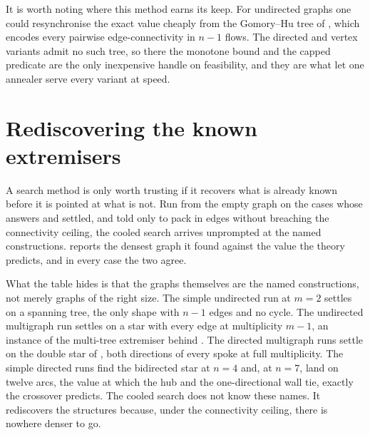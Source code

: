 It is worth noting where this method earns its keep. For undirected graphs one could resynchronise the exact value cheaply from the Gomory--Hu tree of , which encodes every pairwise edge-connectivity in $n - 1$ flows. The directed and vertex variants admit no such tree, so there the monotone bound and the capped predicate are the only inexpensive handle on feasibility, and they are what let one annealer serve every variant at speed.

\section{Rediscovering the known extremisers}

A search method is only worth trusting if it recovers what is already known before it is pointed at what is not. Run from the empty graph on the cases whose answers  and  settled, and told only to pack in edges without breaching the connectivity ceiling, the cooled search arrives unprompted at the named constructions.  reports the densest graph it found against the value the theory predicts, and in every case the two agree.

\begin{table}[t]
    \centering
    
    \caption{Validation by rediscovery. For each variant the temperature search, run from scratch with a handful of restarts, recovers exactly the extremal value proved or certified in the earlier chapters. The ``Search'' column is an honest lower bound found by annealing, and the ``Theory'' column is the proved or certified value.}
    \label{tab:rediscovery}
\end{table}

What the table hides is that the graphs themselves are the named constructions, not merely graphs of the right size. The simple undirected run at $m = 2$ settles on a spanning tree, the only shape with $n - 1$ edges and no cycle. The undirected multigraph run settles on a star with every edge at multiplicity $m - 1$, an instance of the multi-tree extremiser behind . The directed multigraph runs settle on the double star of , both directions of every spoke at full multiplicity. The simple directed runs find the bidirected star at $n = 4$ and, at $n = 7$, land on twelve arcs, the value at which the hub and the one-directional wall tie, exactly the crossover  predicts. The cooled search does not know these names. It rediscovers the structures because, under the connectivity ceiling, there is nowhere denser to go.

